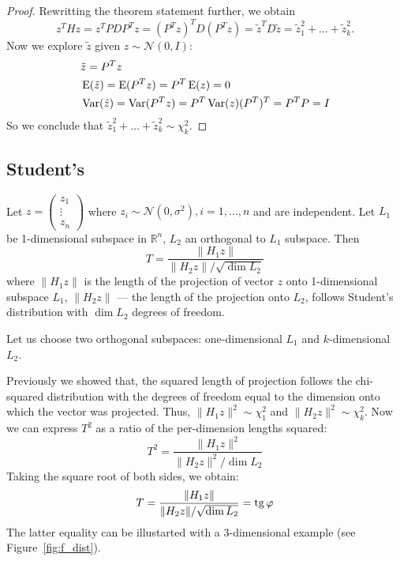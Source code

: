 \begin{proof}
Rewritting the theorem statement further, we obtain
\[
z^T H z = z^T P D P^T z = (P^T z)^T D (P^T z) = \tilde z^T D \tilde z = \tilde z_1^2 + \ldots + \tilde z_k^2.
\]
Now we explore $\tilde z$ given $z \sim \mathcal{N}(0, I)$:
\begin{align*}
&\tilde z = P^T z \\
&\operatorname{E}(\tilde z) = \operatorname{E}(P^T z) = P^T \operatorname{E}(z) = 0 \\
&\operatorname{Var}(\tilde z) = \operatorname{Var}(P^T z) = P^T \operatorname{Var}(z) (P^T)^T = P^T P = I
\end{align*}
So we conclude that $\tilde z_1^2 + \ldots + \tilde z_k^2 \sim \chi^2_k$.

\end{proof}


\subsection{Student's}


\begin{definition}
Let  $z = \begin{pmatrix} z_1 \\ \vdots \\ z_n \end{pmatrix}$
where $z_i \sim \mathcal{N}(0, \sigma^2), i=1, \ldots, n$ and are independent.
Let $L_1$ be 1-dimensional subspace in $\mathbb{R}^{n}$, $L_2$ an orthogonal to $L_1$ subspace.
Then
\[
T = \frac{\lVert H_1 z \rVert}{\lVert H_2 z \rVert / \sqrt{\dim L_2}}
\]
where $\lVert H_1 z \rVert$ is the length of the projection of vector $z$ onto
1-dimensional subspace $L_1$,
$\lVert H_2 z \rVert$ — the length of the projection onto $L_2$,
follows Student's distribution with $\dim L_2$ degrees of freedom.
\end{definition}

Let us choose two orthogonal subspaces: one-dimensional $L_1$ and
$k$-dimensional $L_2$.

Previously we showed that, the squared length of projection follows
the chi-squared distribution with the degrees of freedom equal to the dimension
onto which the vector was projected. Thus, $\lVert H_1 z \rVert^2 \sim \chi^2_1$
and $\lVert H_2 z \rVert^2 \sim \chi^2_{k}$.
Now we can express $T^2$ as a ratio of the per-dimension lengths squared:
\[
T^2 = \frac{\lVert H_1 z \rVert^2}{\lVert H_2 z \rVert^2 / \dim L_2}
\]
Taking the square root of both sides, we obtain:
\[
T = \frac{\lVert H_1 z \rVert}{\lVert H_2 z \rVert / \sqrt{\dim L_2}} = \operatorname{tg} \varphi
\]
The latter equality can be illustarted with a $3$-dimensional example (see Figure~\ref{fig:f_dist}).





